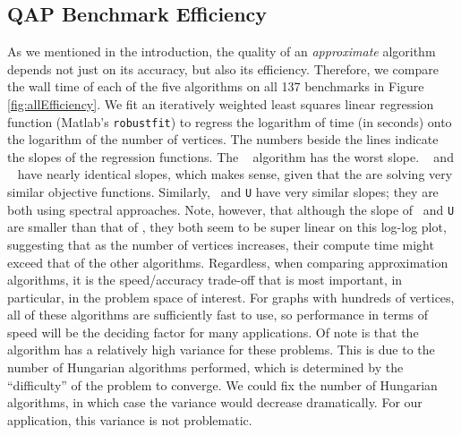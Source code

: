 \documentclass[preprint,11pt]{elsarticle}
\begin{document}

\subsection{QAP Benchmark Efficiency} %
\label{sub:efficiency}


As we mentioned in the introduction, the quality of an \emph{approximate} algorithm depends not just on its accuracy, but also its efficiency.  Therefore, we compare the wall time of each of the five algorithms on all 137 benchmarks in Figure \ref{fig:allEfficiency}.  We fit an iteratively weighted least squares linear regression function (Matlab's \texttt{robustfit}) to regress the logarithm of time (in seconds) onto the logarithm of the number of vertices.  The numbers beside the lines indicate the slopes of the regression functions.  The \Path~ algorithm has the worst slope.  \Qcv~ and \FAQ~ have nearly identical slopes, which makes sense, given that the are solving very similar objective functions.  Similarly, \Rank~and \texttt{U} have very similar slopes; they are both using spectral approaches.  Note, however, that although the slope of \Rank~and \texttt{U} are smaller than that of \FAQ, they both seem to be super linear on this log-log plot, suggesting that as the number of vertices increases, their compute time might exceed that of the other algorithms.  Regardless, when comparing approximation algorithms, it is the speed/accuracy trade-off that is most important, in particular, in the problem space of interest.  For graphs with hundreds of vertices, all of these algorithms are sufficiently fast to use, so performance in terms of speed will be the deciding factor for many applications.  Of note is that the \FAQ~ algorithm has a relatively high variance for these problems.  This is due to the number of Hungarian algorithms performed, which is determined by the ``difficulty'' of the problem to converge.  We could fix the number of Hungarian algorithms, in which case the variance would decrease dramatically.  For our application, this variance is not problematic.
\end{document}
